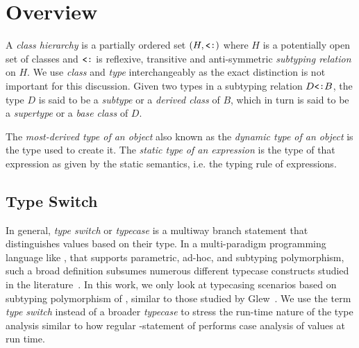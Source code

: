 \section{Overview} %
\label{sec:over}

A \emph{class hierarchy} is a partially ordered set $(H,\subtype)$ where $H$ is a potentially open set 
of classes and $\subtype$ is reflexive, transitive and anti-symmetric 
\emph{subtyping relation} on $H$. We use \emph{class} and \emph{type}  
interchangeably as the exact distinction is not important for this discussion. 
Given two types in a subtyping relation $D \subtype B$, the type $D$ is said to be a 
\emph{subtype} or a \emph{derived class} of $B$, which in turn is said to be a 
\emph{supertype} or a \emph{base class} of $D$. %

The \emph{most-derived type of an object} also known as the \emph{dynamic type 
of an object} is the type used to create it.
The \emph{static type of an expression} is the type of that expression
as given by the static semantics, i.e. the typing rule of expressions.

\subsection{Type Switch}

In general, \emph{type switch} or \emph{typecase} is a multiway branch statement 
that distinguishes values based on their type. In a multi-paradigm programming 
language like \Cpp{}, that supports parametric, ad-hoc, and 
subtyping polymorphism, such a broad definition subsumes numerous different
typecase constructs studied in the literature~\cite{Intensional95,Glew99,OpenShutTypecase05}. 
In this work, we only look at typecasing scenarios based on subtyping polymorphism 
of \Cpp{}, similar to those studied by Glew~\cite{Glew99}. 
We use the term \emph{type switch} instead of a broader \emph{typecase} to 
stress the run-time nature of the type analysis similar to how regular 
-statement of \Cpp{} performs case analysis of values at run time.

